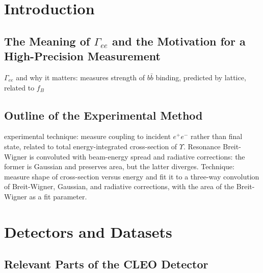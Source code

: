\documentclass[aps,prd,preprint,superscriptaddress,tightenlines,nofootinbib,floatfix]{revtex4}
\begin{document}
%
\section{Introduction}
%

%
\subsection{The Meaning of $\Gamma_{ee}$ and the Motivation for a
High-Precision Measurement}
%

$\Gamma_{ee}$ and why it matters: measures strength of $b\bar{b}$
binding, predicted by lattice, related to $f_B$

%
\subsection{Outline of the Experimental Method}
%

experimental technique: measure coupling to incident $e^+e^-$ rather
than final state, related to total energy-integrated cross-section of
$\Upsilon$.  Resonance Breit-Wigner is convoluted with beam-energy
spread and radiative corrections: the former is Gaussian and preserves
area, but the latter diverges.  Technique: measure shape of
cross-section versus energy and fit it to a three-way convolution of
Breit-Wigner, Gaussian, and radiative corrections, with the area of
the Breit-Wigner as a fit parameter.

%
\section{Detectors and Datasets}
%

%
\subsection{Relevant Parts of the CLEO Detector}
%
\end{document}
